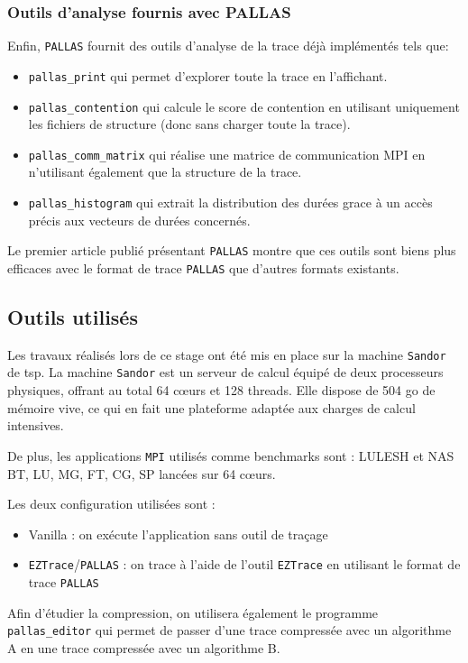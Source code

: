 \subsubsection{Outils d'analyse fournis avec PALLAS}\label{ssec:analysis_tools}

Enfin, \verb!PALLAS! fournit des outils d'analyse de la trace déjà implémentés tels que: 
\begin{itemize}
    \item \verb!pallas_print! qui permet d'explorer toute la trace en l'affichant.
    \item \verb!pallas_contention! qui calcule le score de contention en utilisant uniquement les fichiers de structure (donc sans charger toute la trace).
    \item \verb!pallas_comm_matrix! qui réalise une matrice de communication MPI en n'utilisant également que la structure de la trace.
    \item \verb!pallas_histogram! qui extrait la distribution des durées grace à un accès précis aux vecteurs de durées concernés.
\end{itemize}

Le premier article \cite{pallas_ipdps} publié présentant \verb!PALLAS! montre que ces outils sont biens plus efficaces avec le format de trace \verb!PALLAS! que d'autres formats existants.

\subsection{Outils utilisés}\label{ssec:outils}

Les travaux réalisés lors de ce stage ont été mis en place sur la machine \verb!Sandor! de \gls{tsp}.
La machine \verb!Sandor! est un serveur de calcul équipé de deux processeurs physiques, 
offrant au total 64 c\oe{}urs et 128 threads.
Elle dispose de 504 \gls{go} de mémoire vive, ce qui en fait une plateforme adaptée aux charges de calcul intensives.\par
De plus, les applications \verb!MPI! utilisés comme benchmarks sont : LULESH et NAS BT, LU, MG, FT, CG, SP lancées sur 64 c\oe{}urs.

Les deux configuration utilisées sont : 
\begin{itemize}
    \item Vanilla : on exécute l'application sans outil de traçage
    \item \verb!EZTrace!/\verb!PALLAS! : on trace à l'aide de l'outil \verb!EZTrace! en utilisant le format de trace \verb!PALLAS!
\end{itemize}

Afin d'étudier la compression, on utilisera également le programme \verb!pallas_editor! qui permet de passer d'une trace compressée avec un algorithme A en une trace compressée avec
un algorithme B.
